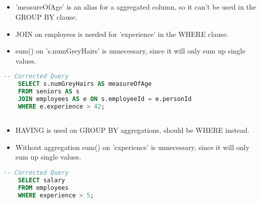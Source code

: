 \subsection{}

\begin{itemize}
	\item 'measureOfAge' is an alias for a aggregated column, so it can't be used in the GROUP BY clause.
	\item JOIN on employees is needed for 'experience' in the WHERE clause.
	\item sum() on 's.numGreyHairs' is unnecessary, since it will only sum up single values.
\end{itemize}

\begin{lstlisting}[language=SQL]
	-- Corrected Query
	SELECT s.numGreyHairs AS measureOfAge
	FROM seniors AS s
	JOIN employees AS e ON s.employeeId = e.personId
	WHERE e.experience > 42;
\end{lstlisting}

\subsection{}

\begin{itemize}
	\item HAVING is used on GROUP BY aggregations, should be WHERE instead.
	\item Without aggregation sum() on 'experience' is unnecessary, since it will only sum up single values.
\end{itemize}

\begin{lstlisting}[language=SQL]
	-- Corrected Query
	SELECT salary
	FROM employees
	WHERE experience > 5;
\end{lstlisting}

